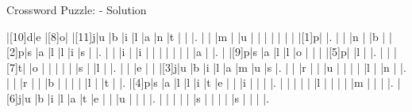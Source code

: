 \documentclass[12pt]{article}
\begin{document}
\newpage
\begin{center}
  \huge{Crossword Puzzle: - Solution}
\end{center}
\vspace{1.5cm}
\PuzzleSolution
\begin{Puzzle}{15}{15}
  |[10]d|e   |[8]o|{}  |[11]j|u   |b   |i   |l   |a   |n   |t   |{}  |{}  |.
  |{}  |{}  |m   |{}  |u   |{}  |{}  |{}  |{}  |{}  |{}  |{}  |[1]p|{}  |.
  |{}  |{}  |n   |{}  |b   |{}  |[2]p|s   |a   |l   |l   |i   |s   |{}  |.
  |{}  |{}  |i   |{}  |i   |{}  |{}  |{}  |{}  |{}  |{}  |{}  |a   |{}  |.
  |{}  |[9]p|s   |a   |l   |l   |o   |{}  |{}  |{}  |[5]p|{}  |l   |{}  |.
  |{}  |{}  |[7]t|{}  |o   |{}  |{}  |{}  |{}  |{}  |s   |{}  |l   |{}  |.
  |{}  |{}  |e   |{}  |{}  |[3]j|u   |b   |i   |l   |a   |m   |u   |s   |.
  |{}  |{}  |r   |{}  |{}  |u   |{}  |{}  |{}  |{}  |l   |{}  |n   |{}  |.
  |{}  |{}  |r   |{}  |{}  |b   |{}  |{}  |{}  |{}  |l   |{}  |t   |{}  |.
  |[4]p|s   |a   |l   |l   |i   |t   |e   |{}  |{}  |i   |{}  |{}  |{}  |.
  |{}  |{}  |{}  |{}  |{}  |l   |{}  |{}  |{}  |{}  |m   |{}  |{}  |{}  |.
  |[6]j|u   |b   |i   |l   |a   |t   |e   |{}  |{}  |u   |{}  |{}  |{}  |.
  |{}  |{}  |{}  |{}  |{}  |s   |{}  |{}  |{}  |{}  |s   |{}  |{}  |{}  |.
\end{Puzzle}
\end{document}
